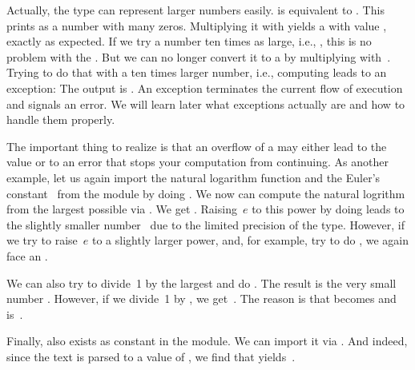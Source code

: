 Actually, the  type can represent larger numbers easily.
 is equivalent to .
This prints as a number with many zeros.
Multiplying it with  yields a  with value , exactly as expected.
If we try a number ten times as large, i.e., , this is no problem with the .
But we can no longer convert it to a  by multiplying with~.
Trying to do that with a ten times larger number, i.e., computing  leads to an exception:
The output is .
An exception terminates the current flow of execution and signals an error.
We will learn later what exceptions actually are and how to handle them properly.

The important thing to realize is that an overflow of a  may either lead to the  value or to an error that stops your computation from continuing.
As another example, let us again import the natural logarithm function  and the Euler's constant~ from the  module by doing .
We now can compute the natural logrithm from the largest possible  via .
We get .
Raising~$e$ to this power by doing  leads to the slightly smaller number~ due to the limited precision of the  type.
However, if we try to raise~$e$ to a slightly larger power, and, for example, try to do , we again face an .

We can also try to divide~1 by the largest  and do \pythonIdx{/}.
The result is the very small number .
However, if we divide~1 by , we get~.
The reason is that  becomes  and \pythonIdx{/} is~.

Finally,  also exists as constant in the  module.
We can import it via .
And indeed, since the text  is parsed to a  value of , we find that  yields~.

